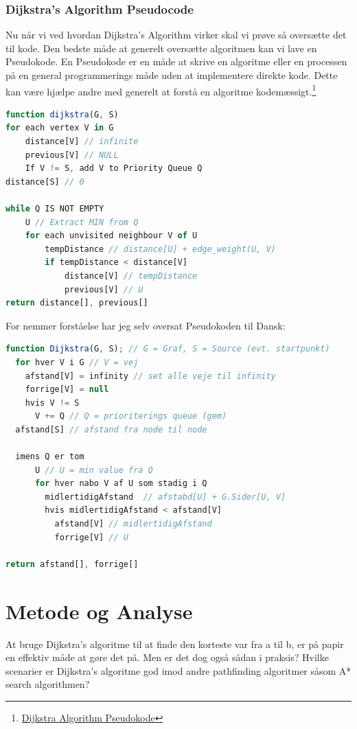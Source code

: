 \documentclass[12pt]{article}
\begin{document}
\subsubsection{Dijkstra’s Algorithm Pseudocode}
Nu når vi ved hvordan Dijkstra’s Algorithm virker skal vi prøve så oversætte det til kode.
Den bedste måde at generelt oversætte algoritmen kan vi lave en Pseudokode. En Pseudokode er en måde at skrive en algoritme eller en processen på en general programmerings måde uden at implementere direkte kode. Dette kan være hjælpe andre med generelt at forstå en algoritme kodemæssigt.\footnote{\href{https://www.programiz.com/dsa/dijkstra-algorithm}{Dijkstra Algorithm Pseudokode}}
\begin{lstlisting}[language=JavaScript, caption=Dijkstra’s Algorithm Pseudocode teoritisk (på Engelsk)]
function dijkstra(G, S)
for each vertex V in G
    distance[V] // infinite
    previous[V] // NULL
    If V != S, add V to Priority Queue Q
distance[S] // 0

while Q IS NOT EMPTY
    U // Extract MIN from Q
    for each unvisited neighbour V of U
        tempDistance // distance[U] + edge_weight(U, V)
        if tempDistance < distance[V]
            distance[V] // tempDistance
            previous[V] // U
return distance[], previous[]
\end{lstlisting}
For nemmer forståelse har jeg selv oversat Pseudokoden til Dansk:
\begin{lstlisting}[language=JavaScript, caption=Dijkstra’s Algorithm Pseudocode oversat til Dansk]
function Dijkstra(G, S); // G = Graf, S = Source (evt. startpunkt)
  for hver V i G // V = vej
    afstand[V] = infinity // set alle veje til infinity
    forrige[V] = null
    hvis V != S
      V += Q // Q = prioriterings queue (gem)
  afstand[S] // afstand fra node til node

  imens Q er tom
      U // U = min value fra Q
      for hver nabo V af U som stadig i Q
        midlertidigAfstand  // afstabd[U] + G.Sider[U, V]
        hvis midlertidigAfstand < afstand[V]
          afstand[V] // midlertidigAfstand
          forrige[V] // U

return afstand[], forrige[]
\end{lstlisting}
  

\newpage
\section{Metode og Analyse}
At bruge Dijkstra's algoritme til at finde den korteste var fra a til b, er på papir en effektiv måde at gøre det på. Men er det dog også sådan i praksis? Hvilke scenarier er Dijkstra's algoritme god imod andre pathfinding algoritmer såsom A* search algorithmen? 
\end{document}
